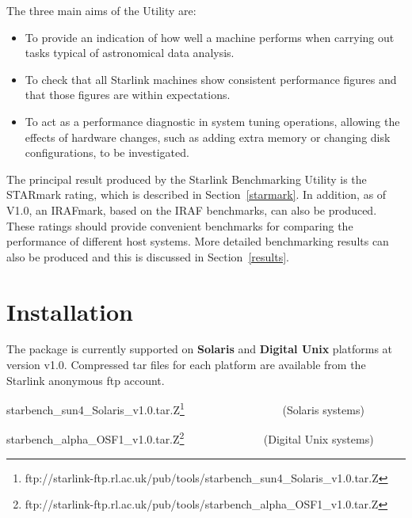 \documentclass[11pt]{article}
\newcommand{\htmladdnormallinkfoot}[2]{#1\footnote{#2}}
\newcommand{\pkgver}     {v1.0}
\newcommand{\pkgftpdir}  {/pub/tools}
\newcommand{\pkgftpsrv} {starlink-ftp.rl.ac.uk}
\newcommand{\pkgurl} {ftp://\pkgftpsrv\pkgftpdir}
\begin{document}
The three main aims of the Utility are:

\begin{itemize}
\item To provide an indication of how well a machine performs when
carrying out tasks typical of astronomical data analysis.

\item To check that all Starlink machines show consistent performance
figures and that those figures are within expectations.

\item To act as a performance diagnostic in system tuning operations, allowing
the effects of hardware changes, such as adding extra memory or changing
disk configurations, to be investigated.
\end{itemize}

The principal result produced by the Starlink Benchmarking Utility is
the STARmark rating, which is described in Section~\ref{starmark}. In
addition, as of V1.0, an IRAFmark, based on the IRAF benchmarks, can
also be produced. These ratings should provide convenient benchmarks
for comparing the performance of different host systems. More detailed
benchmarking results can also be produced and this is discussed in
Section~\ref{results}.



\section{Installation}

The package is currently supported on {\bf Solaris} and {\bf Digital
Unix} platforms at version \pkgver. Compressed tar files for each
platform are available from the Starlink anonymous ftp account.

\vspace{3mm}
\htmladdnormallinkfoot{starbench\_sun4\_Solaris\_\pkgver.tar.Z}{\pkgurl/starbench\_sun4\_Solaris\_\pkgver.tar.Z} ~~~~~~~~~~~~~~~~~(Solaris systems) 

\htmladdnormallinkfoot{starbench\_alpha\_OSF1\_\pkgver.tar.Z}{\pkgurl/starbench\_alpha\_OSF1\_\pkgver.tar.Z} ~~~~~~~~~~~~~ (Digital Unix systems) 


\end{document}
